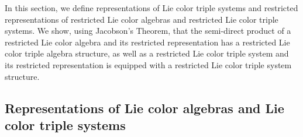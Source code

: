 \documentclass[11pt, twoside]{article}
\begin{document}
In this section, we define  representations of  Lie color triple systems and  restricted representations of  restricted Lie color algebras and  restricted Lie color triple systems. We  show, using Jacobson's Theorem, that  the semi-direct product of a restricted Lie color algebra and its restricted representation has a  restricted Lie color triple algebra structure, as well as   a restricted Lie color triple system and its restricted representation is equipped with  a restricted Lie color triple system structure. 

\subsection{Representations of Lie color algebras and Lie color triple systems}



\end{document}
